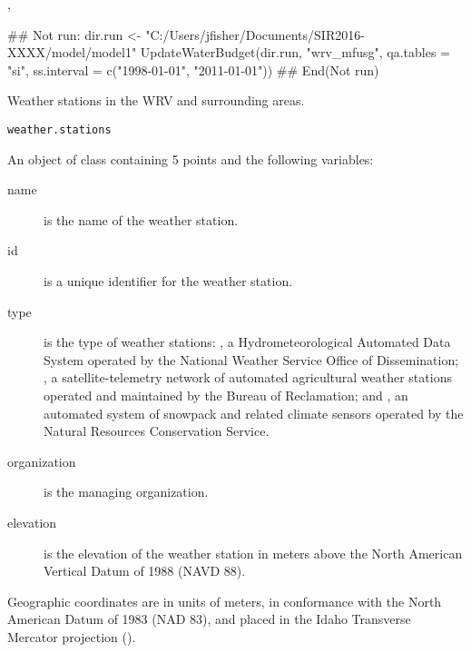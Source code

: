 \documentclass[letterpaper]{book}
\begin{document}
%
\begin{SeeAlso}\relax
{}, 
\end{SeeAlso}
%
\begin{Examples}
\begin{ExampleCode}
## Not run: 
dir.run <- "C:/Users/jfisher/Documents/SIR2016-XXXX/model/model1"
UpdateWaterBudget(dir.run, "wrv_mfusg", qa.tables = "si",
                  ss.interval = c("1998-01-01", "2011-01-01"))
## End(Not run)
\end{ExampleCode}
\end{Examples}
%
\begin{Description}\relax
Weather stations in the WRV and surrounding areas.
\end{Description}
%
\begin{Usage}
\begin{verbatim}
weather.stations
\end{verbatim}
\end{Usage}
%
\begin{Format}
An object of  class containing 5 points and the following variables:
\begin{description}

\item[name] is the name of the weather station.
\item[id] is a unique identifier for the weather station.
\item[type] is the type of weather stations:
, a Hydrometeorological Automated Data System operated by the National Weather Service Office of Dissemination;
, a satellite-telemetry network of automated agricultural weather stations operated and maintained by the Bureau of Reclamation; and
, an automated system of snowpack and related climate sensors operated by the Natural Resources Conservation Service.
\item[organization] is the managing organization.
\item[elevation] is the elevation of the weather station in meters above the North American Vertical Datum of 1988 (NAVD 88).

\end{description}

Geographic coordinates are in units of meters, in conformance with the North American Datum of 1983 (NAD 83), and placed in the
Idaho Transverse Mercator projection ().
\end{Format}
\end{document}
